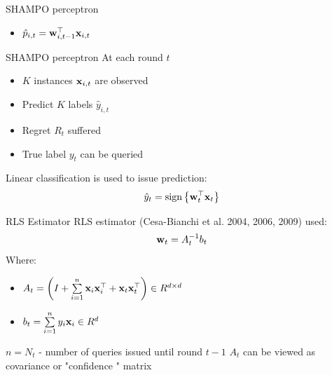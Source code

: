 \documentclass{beamer}
\begin{document}
\begin{frame}{SHAMPO perceptron}
\begin{itemize}
\item $\hat{p}_{i,t}={\mathbf{w}}^{\top}_{i,t-1}\mathbf{x}_{i,t} $
\end{itemize}
\end{frame}

\begin{frame}{SHAMPO perceptron}
At each round $t$ \newline
\begin{itemize}
\item $K$ instances $\mathbf{x}_{i,t}$ are observed\newline
\item Predict $K$ labels  $\hat{y}_{i,t}$ \newline
\item Regret $R_t$ suffered\newline
\item True label $y_t$ can be queried \newline
\end{itemize}
Linear classification is used to issue prediction:
\begin{equation*}
\hat{y}_t={\rm sign}\left\{{\mathbf{w}}^{\top}_{t}\mathbf{x}_{t}\right\}
\end{equation*}
\end{frame}


\begin{frame}{RLS Estimator}
RLS estimator (Cesa-Bianchi et al. 2004, 2006, 2009) used:
\begin{equation*}
\mathbf{w}_{t}=A_{t}^{-1}b_t
\label{RLS2}
\end{equation*}
Where:\newline
\begin{itemize} 
\item $A_t=\left(I+\sum\limits_{i=1}^{n}\mathbf{x}_{i} {\mathbf{x}}^{\top}_{i}+ \mathbf{x}_{t} {\mathbf{x}}^{\top}_{t}\right)\in R^{d\times d}$\newline
\item $b_t=\sum\limits_{i=1}^{n}y_i\mathbf{x}_{i}\in R^d$ \newline
\end{itemize}
 $n=N_t$ - number of queries issued until round $t-1$\newline\newline
$A_t$ can be viewed as covariance or "confidence " matrix
\end{frame}
\end{document}
